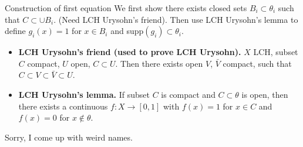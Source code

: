 \begin{details}{Construction of first equation}
We first show there exists closed sets $B_i \subset \theta_i$ such that $C \subset \cup B_i$. (Need LCH Urysohn's friend). Then use LCH Urysohn's lemma to define $g_i(x) = 1$ for $x \in B_i$ and supp$(g_i) \subset \theta_i$.
\begin{itemize}
    \item \textbf{LCH Urysohn's friend (used to prove LCH Urysohn).} $X$ LCH, subset $C$ compact, $U$ open, $C \subset U$. Then there exists open $V$, $\bar{V}$ compact, such that $C \subset V \subset \bar{V} \subset U$.
    \item \textbf{LCH Urysohn's lemma.} If subset $C$ is compact and $C \subset \theta$ is open, then there exists a continuous $f: X \rightarrow [0,1]$ with $f(x) = 1$ for $x \in C$ and $f(x) = 0$ for $x \not \in \theta$.
\end{itemize}
Sorry, I come up with weird names.
\end{details}
